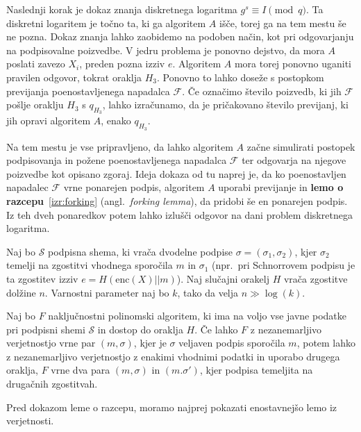 \documentclass[isrm2, tisk]{fmfdelo}
\begin{document}
Naslednji korak je dokaz znanja diskretnega logaritma $g^s \equiv I \pmod q$. Ta diskretni logaritem
je točno ta, ki ga algoritem $A$ išče, torej ga na tem mestu še ne pozna. Dokaz znanja lahko zaobidemo
na podoben način, kot pri odgovarjanju na podpisovalne poizvedbe. V jedru problema je ponovno dejstvo,
da mora $A$ poslati zavezo $X_i$, preden pozna izziv $e$. Algoritem $A$ mora torej ponovno uganiti
pravilen odgovor, tokrat oraklja $H_3$. Ponovno to lahko doseže s postopkom previjanja poenostavljenega
napadalca $\mathcal{F}$. Če označimo število poizvedb, ki jih $\mathcal{F}$ pošlje oraklju $H_3$ s
$q_{H_3}$, lahko izračunamo, da je pričakovano število previjanj, ki jih opravi algoritem $A$,
enako $q_{H_3}$.

Na tem mestu je vse pripravljeno, da lahko algoritem $A$ začne simulirati postopek podpisovanja in
požene poenostavljenega napadalca $\mathcal{F}$ ter odgovarja na njegove poizvedbe kot opisano zgoraj.
Ideja dokaza od tu naprej je, da ko poenostavljen napadalec $\mathcal{F}$ vrne ponarejen podpis,
algoritem $A$ uporabi previjanje in \textbf{lemo o razcepu}~\ref{izr:forking} (angl.\
\textit{forking lemma}), da pridobi še en ponarejen podpis. Iz teh dveh ponaredkov potem lahko
izlušči odgovor na dani problem diskretnega logaritma.

\begin{izrek}
\label{izr:forking}
    Naj bo $\mathcal{S}$ podpisna shema, ki vrača dvodelne podpise $\sigma = (\sigma_1, \sigma_2)$,
    kjer $\sigma_2$ temelji na zgostitvi vhodnega sporočila $m$ in $\sigma_1$ (npr.\ pri Schnorrovem 
    podpisu je ta zgostitev izziv  $e = H(\text{enc}(X) || m)$). Naj slučajni orakelj $H$ vrača zgostitve
    dolžine $n$. Varnostni parameter naj bo $k$, tako da velja $n \gg \log(k)$.

    Naj bo $F$ naključnostni polinomski algoritem, ki ima na voljo vse javne podatke pri podpisni
    shemi $\mathcal{S}$ in dostop do oraklja $H$. Če lahko $F$ z nezanemarljivo verjetnostjo vrne par
    $(m, \sigma)$, kjer je $\sigma$  veljaven podpis sporočila $m$, potem lahko z nezanemarljivo
    verjetnostjo z enakimi vhodnimi podatki in uporabo drugega oraklja, $F$ vrne dva para
    $(m, \sigma)$ in $(m. \sigma')$, kjer podpisa temeljita na drugačnih zgostitvah.
\end{izrek}

Pred dokazom leme o razcepu, moramo najprej pokazati enostavnejšo lemo iz verjetnosti.
\end{document}

